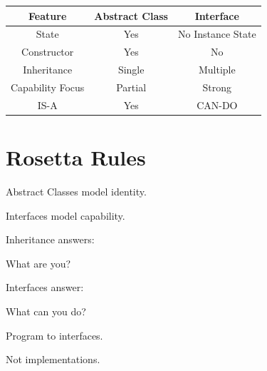 \documentclass[11pt,a4paper]{book}
\begin{document}
\begin{center}

\begin{tabular}{|c|c|c|}
\hline
Feature &
Abstract Class &
Interface\\
\hline

State &
Yes &
No Instance State\\
\hline

Constructor &
Yes &
No\\
\hline

Inheritance &
Single &
Multiple\\
\hline

Capability Focus &
Partial &
Strong\\
\hline

IS-A &
Yes &
CAN-DO\\
\hline

\end{tabular}

\end{center}


\section{Rosetta Rules}

\begin{rosettarule}

Abstract Classes model identity.

\end{rosettarule}

\begin{rosettarule}

Interfaces model capability.

\end{rosettarule}

\begin{rosettarule}

Inheritance answers:

What are you?

\end{rosettarule}

\begin{rosettarule}

Interfaces answer:

What can you do?

\end{rosettarule}

\begin{rosettarule}

Program to interfaces.

Not implementations.

\end{rosettarule}
\end{document}
